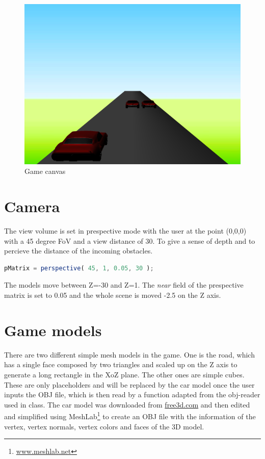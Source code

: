 \documentclass[english]{revdetua}
\begin{document}
\begin{figure}[h]
	\centering
	\includegraphics[width=\linewidth]{game.png}  
	\caption{Game canvas}
	\label{fig:game}
\end{figure}

\section{Camera}
The view volume is set in prespective mode with the user at the point (0,0,0) with a 45 degree FoV and a view distance of 30. To give a sense of depth and to percieve the distance of the incoming obstacles.

\begin{lstlisting}[language=JavaScript]
	pMatrix = perspective( 45, 1, 0.05, 30 );
\end{lstlisting}

The models move between Z=-30 and Z=1. The \textit{near} field of the prespective matrix is set to 0.05 and the whole scene is moved -2.5 on the Z axis.

\section{Game models}
There are two different simple mesh models in the game. One is the road, which has a single face composed by two triangles and scaled up on the Z axis to generate a long rectangle in the XoZ plane. The other ones are simple cubes. These are only placeholders and will be replaced by the car model once the user inputs the OBJ file, which is then read by a function adapted from the obj-reader used in class. The car model was downloaded from \url{free3d.com} and then edited and simplified using MeshLab\footnote{\url{www.meshlab.net}} to create an OBJ file with the information of the vertex, vertex normals, vertex colors and faces of the 3D model.
\end{document}
